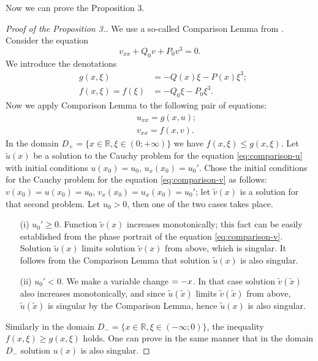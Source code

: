 Now we can prove the Proposition 3.
\begin{proof}[Proof of the Proposition 3.]
	We use a so-called Comparison Lemma from \cite[Appendix C]{AlfimovZezyulin}.
	Consider the equation
	\begin{equation}
		v_{xx} + Q_0 v + P_0 v^3 = 0.
	\end{equation}
	We introduce the denotations
	\begin{eqnarray}
		& g(x, \xi) & = -Q(x) \xi - P(x) \xi^3; \\
		& f(x, \xi) = f(\xi) & = -Q_0 \xi - P_0 \xi^3.
	\end{eqnarray}
	Now we apply Comparison Lemma to the following pair of equations:
	\begin{eqnarray}
		&& u_{xx} = g(x, u) \label{eq:comparison-u}; \\
		&& v_{xx} = f(x, v) \label{eq:comparison-v}.
	\end{eqnarray}
	In the domain $D_+ = \{ x \in \mathbb{R}, \xi \in (0; +\infty) \}$ we have $f(x, \xi) \le g(x, \xi)$.
	Let $\tilde{u}(x)$ be a solution to the Cauchy problem for the equation \eqref{eq:comparison-u} with initial conditions $u(x_0) = u_0$, $u_x(x_0) = u_0'$.
	Chose the initial conditions for the Cauchy problem for the equation \eqref{eq:comparison-v} as follows: $v(x_0) = u(x_0) = u_0$, $v_x(x_0) = u_x(x_0) = u_0'$; let $\tilde{v}(x)$ is a solution for that second problem.
	Let $u_0 > 0$, then one of the two cases takes place.
	\begin{enumerate}
		\item[(i)] $u_0' \ge 0$.
		Function $\tilde{v}(x)$ increases monotonically; this fact can be easily established from the phase portrait of the equation \eqref{eq:comparison-v}.
		Solution $\tilde{u}(x)$ limits solution $\tilde{v}(x)$ from above, which is singular.
		It follows from the Comparison Lemma that solution $\tilde{u}(x)$ is also singular.
		\item[(ii)] $u_0' < 0$.
		We make a variable change $\title{x} = -x$.
		In that case solution $\tilde{v}(\tilde{x})$ also increases monotonically, and since $\tilde{u}(\tilde{x})$ limits $\tilde{v}(\tilde{x})$ from above, $\tilde{u}(\tilde{x})$ is singular by the Comparison Lemma, hence $\tilde{u}(x)$ is also singular.
	\end{enumerate}
	Similarly in the domain $D_- = \{ x \in \mathbb{R}, \xi \in (-\infty; 0) \}$, the inequality $f(x, \xi) \ge g(x, \xi)$ holds.
	One can prove in the same manner that in the domain $D_-$ solution $u(x)$ is also singular.
\end{proof}

